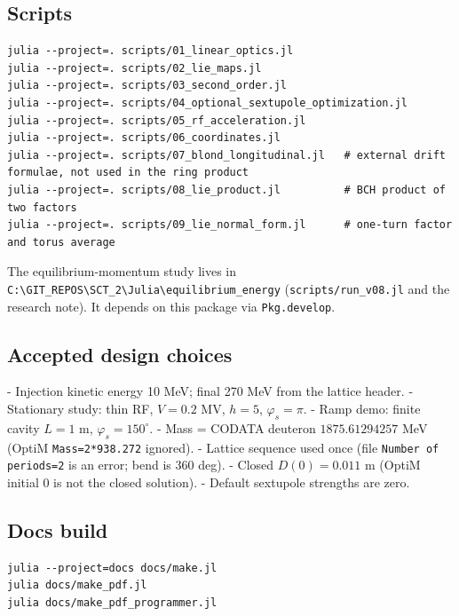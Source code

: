 \documentclass[11pt,a4paper]{article}
\begin{document}
\subsection{Scripts}

\begin{verbatim}
julia --project=. scripts/01_linear_optics.jl
julia --project=. scripts/02_lie_maps.jl
julia --project=. scripts/03_second_order.jl
julia --project=. scripts/04_optional_sextupole_optimization.jl
julia --project=. scripts/05_rf_acceleration.jl
julia --project=. scripts/06_coordinates.jl
julia --project=. scripts/07_blond_longitudinal.jl   # external drift formulae, not used in the ring product
julia --project=. scripts/08_lie_product.jl          # BCH product of two factors
julia --project=. scripts/09_lie_normal_form.jl      # one-turn factor and torus average
\end{verbatim}

The equilibrium-momentum study lives in \texttt{C:\textbackslash{}GIT\_REPOS\textbackslash{}SCT\_2\textbackslash{}Julia\textbackslash{}equilibrium\_energy}
(\texttt{scripts/run\_v08.jl} and the research note). It depends on this package
via \texttt{Pkg.develop}.

\subsection{Accepted design choices}

- Injection kinetic energy 10 MeV; final 270 MeV from the lattice header.
- Stationary study: thin RF, $V=0.2$ MV, $h=5$, $\varphi_s=\pi$.
- Ramp demo: finite cavity $L=1$ m, $\varphi_s=150^\circ$.
- Mass = CODATA deuteron $1875.61294257$ MeV (OptiM \texttt{Mass=2*938.272} ignored).
- Lattice sequence used once (file \texttt{Number of periods=2} is an error; bend is 360 deg).
- Closed $D(0)=0.011$ m (OptiM initial 0 is not the closed solution).
- Default sextupole strengths are zero.

\subsection{Docs build}

\begin{verbatim}
julia --project=docs docs/make.jl
julia docs/make_pdf.jl
julia docs/make_pdf_programmer.jl
\end{verbatim}
\end{document}
